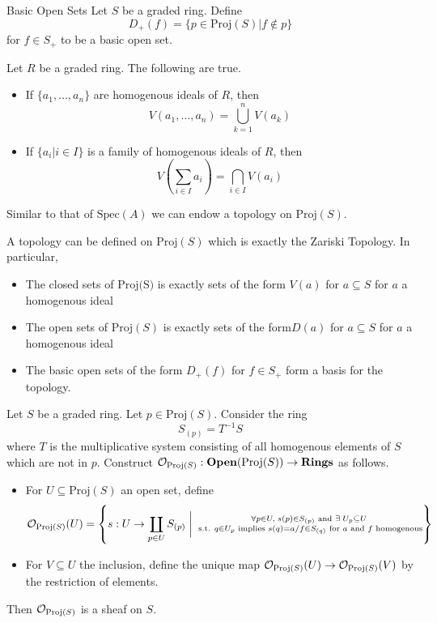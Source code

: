 \documentclass[a4paper]{article}
\begin{document}
\begin{defn}{Basic Open Sets}{} Let $S$ be a graded ring. Define $$D_+(f)=\{p\in\text{Proj}(S)|f\notin p\}$$ for $f\in S_+$ to be a basic open set. 
\end{defn}

\begin{prp}{}{} Let $R$ be a graded ring. The following are true. 
\begin{itemize}
\item If $\{a_1,\dots,a_n\}$ are homogenous ideals of $R$, then $$V(a_1,\dots,a_n)=\bigcup_{k=1}^nV(a_k)$$
\item If $\{a_i|i\in I\}$ is a family of homogenous ideals of $R$, then $$V\left(\sum_{i\in I}a_i\right)=\bigcap_{i\in I}V(a_i)$$
\end{itemize}
\end{prp}

Similar to that of $\text{Spec}(A)$ we can endow a topology on $\text{Proj}(S)$. 

\begin{thm}{}{} A topology can be defined on $\text{Proj}(S)$ which is exactly the Zariski Topology. In particular, 
\begin{itemize}
\item The closed sets of $\text{Proj(S)}$ is exactly sets of the form $V(a)$ for $a\subseteq S$ for $a$ a homogenous ideal
\item The open sets of $\text{Proj}(S)$ is exactly sets of the form$ D(a)$ for $a\subseteq S$ for $a$ a homogenous ideal
\item The basic open sets of the form $D_+(f)$ for $f\in S_+$ form a basis for the topology. 
\end{itemize}
\end{thm}

\begin{thm}{}{} Let $S$ be a graded ring. Let $p\in\text{Proj}(S)$. Consider the ring $$S_{(p)}=T^{-1}S$$ where $T$ is the multiplicative system consisting of all homogenous elements of $S$ which are not in $p$. Construct $\mathcal{O}_{\text{Proj}(S)}:\bold{Open}(\text{Proj}(S))\to\bold{Rings}$ as follows. 
\begin{itemize}
\item For $U\subseteq\text{Proj}(S)$ an open set, define $$\mathcal{O}_{\text{Proj}(S)}(U)=\left\{s:U\to\coprod_{p\in U}S_{(p)}\;\bigg{|}\;\substack{\forall p\in U,\;s(p)\in S_{(p)}\text{ and }\exists\;U_p\subseteq U\\\text{ s.t. }q\in U_p\text{ implies }s(q)=a/f\in S_{(q)}\text{ for }a\text{ and }f\text{ homogenous}}\right\}$$
\item For $V\subseteq U$ the inclusion, define the unique map $\mathcal{O}_{\text{Proj}(S)}(U)\to\mathcal{O}_{\text{Proj}(S)}(V)$ by the restriction of elements. 
\end{itemize}
Then $\mathcal{O}_{\text{Proj}(S)}$ is a sheaf on $S$. 
\end{thm}
\end{document}
